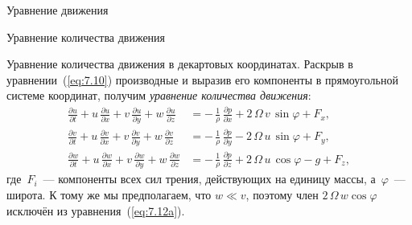\begin{chapter}{Уравнение движения}
\begin{section}{Уравнение количества движения}
\begin{paragraph}{Уравнение количества движения в декартовых координатах.}
Раскрыв в уравнении~(\ref{eq:7.10}) производные и выразив его компоненты 
в прямоугольной системе координат, получим \emph{уравнение количества движения}:
\begin{subequations}\label{eq:7.12}
\begin{align}
\frac{\partial{u}}{\partial{t}} 
 + u\,\frac{\partial{u}}{\partial{x}}
 + v\,\frac{\partial{u}}{\partial{y}} 
 + w\,\frac{\partial{u}}{\partial{z}} 
&= -\,\frac{1}{\rho}\,\frac{\partial{p}}{\partial{x}} 
   + 2\,\Omega\,{v}\,\sin\varphi +  F_x, \label{eq:7.12a}\\
%
\frac{\partial{v}}{\partial{t}} 
 + u\,\frac{\partial{v}}{\partial{x}} 
 + v\,\frac{\partial{v}}{\partial{y}} 
 + w\,\frac{\partial{v}}{\partial{z}} 
&= -\,\frac{1}{\rho}\,\frac{\partial{p}}{\partial{y}} 
   - 2\,\Omega\,u\,\sin\varphi + F_y, \\
%
\frac{\partial{w}}{\partial{t}} 
 + u\,\frac{\partial{w}}{\partial{x}} 
 + v\,\frac{\partial{w}}{\partial{y}} 
 + w\,\frac{\partial{w}}{\partial{z}} 
&= -\,\frac{1}{\rho}\,\frac{\partial{p}}{\partial{z}} 
   + 2\,\Omega\,{u}\,\cos\varphi - g + F_z,\label{eq:7.12c}
\end{align}
\end{subequations}
где~$F_i$~--- компоненты всех сил трения, действующих на единицу массы,
а~$\varphi$~--- широта. К тому же мы предполагаем, что $w \ll v$, поэтому
член $2\,\Omega\,w \cos \varphi$ исключён из уравнения~(\ref{eq:7.12a}).
%

\end{paragraph}
\end{section}
\end{chapter}
